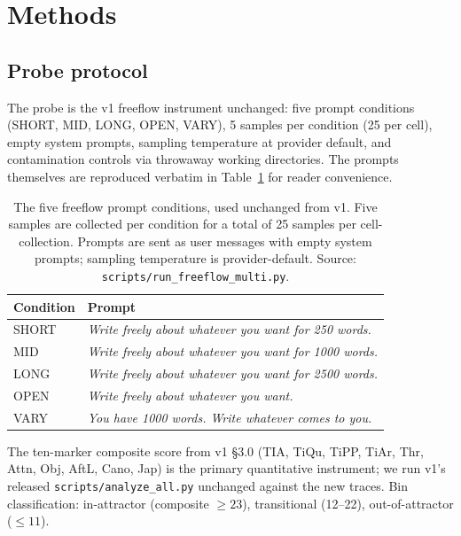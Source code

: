\documentclass[11pt,a4paper]{article}
\begin{document}
\section{Methods}
\label{sec:methods}

\subsection{Probe protocol}

The probe is the v1 freeflow instrument unchanged: five prompt conditions (SHORT, MID, LONG, OPEN, VARY), 5 samples per condition (25 per cell), empty system prompts, sampling temperature at provider default, and contamination controls via throwaway working directories. The prompts themselves are reproduced verbatim in Table~\ref{tab:prompts} for reader convenience.

\begin{table}[h]
\centering
\caption{The five freeflow prompt conditions, used unchanged from v1. Five samples are collected per condition for a total of 25 samples per cell-collection. Prompts are sent as user messages with empty system prompts; sampling temperature is provider-default. Source: \texttt{scripts/run\_freeflow\_multi.py}.}
\label{tab:prompts}
\small
\begin{tabular}{lp{}}
\toprule
\textbf{Condition} & \textbf{Prompt} \\
\midrule
SHORT & \emph{Write freely about whatever you want for 250 words.} \\
MID   & \emph{Write freely about whatever you want for 1000 words.} \\
LONG  & \emph{Write freely about whatever you want for 2500 words.} \\
OPEN  & \emph{Write freely about whatever you want.} \\
VARY  & \emph{You have 1000 words. Write whatever comes to you.} \\
\bottomrule
\end{tabular}
\end{table}

\begin{sloppypar}
The ten-marker composite score from v1 \S3.0 (TIA, TiQu, TiPP, TiAr, Thr, Attn, Obj, AftL, Cano, Jap) is the primary quantitative instrument; we run v1's released \texttt{scripts/\allowbreak analyze\_all.py} unchanged against the new traces. Bin classification: in-attractor (composite $\ge 23$), transitional (12--22), out-of-attractor ($\le 11$).
\end{sloppypar}
\end{document}
